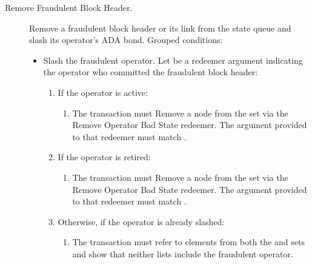 \documentclass[../midgard.tex]{subfiles}
\begin{document}
\begin{description}
    \item[Remove Fraudulent Block Header.] Remove a fraudulent block header or its link from the state queue and slash its operator's ADA bond.
      Grouped conditions:
    \begin{itemize}
        \item Slash the fraudulent operator.
          Let  be a redeemer argument indicating the operator who committed the fraudulent block header:
        \begin{enumerate}
            \item If the operator is active:
                \begin{enumerate}
                    \item The transaction must Remove a node from the  set via the Remove Operator Bad State redeemer.
                      The  argument provided to that redeemer must match .
                \end{enumerate}
            \item If the operator is retired:
                \begin{enumerate}
                    \item The transaction must Remove a node from the  set via the Remove Operator Bad State redeemer.
                      The  argument provided to that redeemer must match .
                \end{enumerate}
            \item Otherwise, if the operator is already slashed:
                \begin{enumerate}
                    \item The transaction must refer to elements from both the  and  sets and show that neither lists include the fraudulent operator.
                \end{enumerate}
        \end{enumerate}


\end{itemize}
\end{description}
\end{document}
